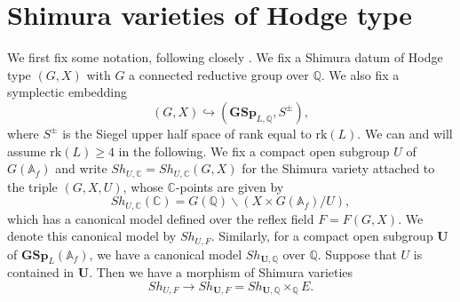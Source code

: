\documentclass[11pt,oneside,reqno]{amsart}
\newcommand{\bfGSp}{\mathbf{GSp}}
\newcommand{\A}{\mathbb{A}}
\newcommand{\C}{\mathbb{C}}
\newcommand{\Q}{\mathbb{Q}}
\newcommand{\Ubf}{\mathbf{U}}
\theoremstyle{plain}
\begin{document}
	
	
	
	
	
	
	
	
	
	
	
	
	
	
	
	
	
	
	\section{Shimura varieties of Hodge type}\label{Shimura varieties of Hodge type}
	We first fix some notation, following closely
	\cite{Kisin2010,Kisin2017,Wortmann2013,Zhang2025}.
	We fix a Shimura datum of Hodge type $(G,X)$ with $G$ a connected reductive group over $\Q$. We also fix a symplectic embedding
	\[
	(G,X)\hookrightarrow(\bfGSp_{L,\Q},S^\pm),
	\]
	where $S^\pm$ is the Siegel upper half space of rank equal to $\mathrm{rk}(L)$. We can and will assume $\mathrm{rk}(L)\ge4$ in the following.
	We fix a compact open subgroup $U$ of $G(\A_f)$ and write $Sh_{U,\C}=Sh_{U,\C}(G,X)$ for the Shimura variety attached to the triple $(G,X,U)$, whose $\C$-points are given by
	\begin{equation}\label{S_K(C) and double coset}
		Sh_{U,\C}(\C)
		=
		G(\Q)\backslash(X\times G(\A_f)/U),
	\end{equation}
	which has a canonical model defined over the reflex field $F=F(G,X)$. We denote this canonical model by $ Sh_{U,F}$. Similarly, for a compact open subgroup $\Ubf$ of $\bfGSp_L(\A_f)$, we have a canonical model $ Sh_{\Ubf,\Q}$ over $\Q$. Suppose that $U$ is contained in $\Ubf$. Then we have a morphism of Shimura varieties
	\[
	Sh_{U,F}\to Sh_{\Ubf,F}= Sh_{\Ubf,\Q}\times_\Q E.
	\]
	
	
	
	
	
	
	
	
	
\end{document}

